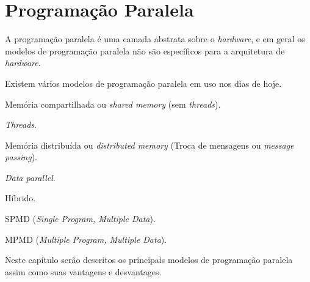
\chapter{Programação Paralela}

A programação paralela é uma camada abstrata sobre o \textit{hardware}, e em 
geral os modelos de programação paralela não são específicos para a arquitetura
de \textit{hardware}.

Existem vários modelos de programação paralela em uso nos dias de hoje.

\begin{alineas}
        \item Memória compartilhada ou \textit{shared memory} (sem
                        \textit{threads}).
        \item \textit{Threads}.
        \item Memória distribuída ou \textit{distributed memory} (Troca de
                        mensagens ou \textit{message passing}).
        \item \textit{Data parallel}.
        \item Híbrido.
        \item SPMD (\textit{Single Program, Multiple Data}).
        \item MPMD (\textit{Multiple Program, Multiple Data}).
\end{alineas}

Neste capítulo serão descritos os principais modelos de programação paralela
assim como suas vantagens e desvantages.



